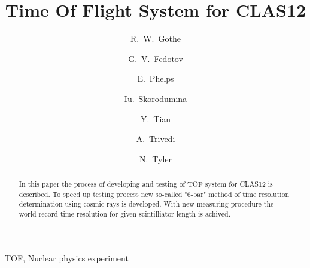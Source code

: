 \documentclass[preprint,12pt]{elsarticle}
\begin{document}
\begin{frontmatter}



\title{Time Of Flight System for CLAS12}

\author[USC]{R.~W.~Gothe}
\author[USC]{G.~V.~Fedotov}
\author[USC]{E.~Phelps}
\author[USC]{Iu.~Skorodumina}
\author[USC]{Y.~Tian}
\author[USC]{A.~Trivedi}
\author[USC]{N.~Tyler}

\address[USC]{University of South Carolina, Columbia, South Carolina 29208}

\author{}

\address{}

\begin{abstract}
In this paper the process of developing and testing of TOF system for CLAS12 is described. To speed up testing process new so-called "6-bar" method of time resolution determination using cosmic rays is developed. With new measuring procedure the world record time resolution for given scintilliator length is achived.  

\end{abstract}

\begin{keyword}
TOF, Nuclear physics experiment


\end{keyword}

\end{frontmatter}


\pagebreak






































\pagebreak
\newpage



\end{document}
